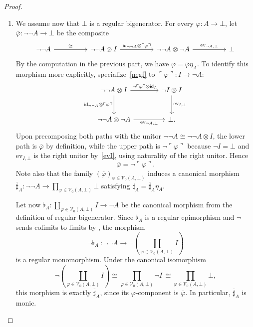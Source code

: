\documentclass[11pt,onecolumn]{article}
\newcommand{\id}{\mathsf{id}}
\newcommand{\ev}{\mathrm{ev}}
\newcommand{\cV}{\mathscr{V}}
\newcommand{\name}[1]{\ulcorner #1 \urcorner}
\theoremstyle{plain}
\theoremstyle{remark}
\theoremstyle{definition}
\begin{document}
\begin{proof}
\begin{enumerate}
		\item We assume now that $\bot$ is a regular bigenerator.
			For every $\varphi \colon A \to \bot$, let $\overline{\varphi} \colon \neg\neg A \to \bot$ be the composite
			\[
				\begin{tikzcd}[column sep=4pc]
					\neg\neg A \ar[r, "\cong"] & \neg\neg A \otimes I \ar[r, "\id_{\neg\neg A} \otimes \name{\varphi}"]
					& \neg\neg A \otimes \neg A \ar[r, "\ev_{\neg A,\bot}"] & \bot
				\end{tikzcd}
			\]
			By the computation in the previous part, we have $\varphi = \overline{\varphi}\eta_A$.
			To identify this morphism more explicitly, specialize~\eqref{negf} to
			$\name{\varphi} \colon I \to \neg A$:
			\[
				\begin{tikzcd}[column sep=large,row sep=large]
					\neg\neg A \otimes I
					\ar[r, "\neg\name{\varphi} \otimes \id_I"]
					\ar[d, "\id_{\neg\neg A} \otimes \name{\varphi}"']
					& \neg I \otimes I \ar[d, "\ev_{I,\bot}"] \\
					\neg\neg A \otimes \neg A
					\ar[r, "\ev_{\neg A,\bot}"']
					& \bot.
				\end{tikzcd}
			\]
			Upon precomposing both paths with the unitor
			$\neg\neg A \cong \neg\neg A \otimes I$, the lower path is
			$\overline{\varphi}$ by definition, while the upper path is
			$\neg\name{\varphi}$ because $\neg I = \bot$ and
			$\ev_{I,\bot}$ is the right unitor by~\eqref{evI}, using
			naturality of the right unitor.
			Hence
			\[
				\overline{\varphi} = \neg\name{\varphi}.
			\]
			Note also that the family $(\overline{\varphi})_{\varphi \in \cV_0(A,\bot)}$ induces a canonical morphism
			$\overline{\sharp}_A \colon \neg\neg A \to \prod_{\varphi \in \cV_0(A,\bot)} \bot$
			satisfying
			$\sharp_A = \overline{\sharp}_A \eta_A$.

			Let now
			$\flat_A \colon \coprod_{\varphi \in \cV_0(A,\bot)} I \to \neg A$
			be the canonical morphism from the definition of regular bigenerator.
			Since $\flat_A$ is a regular epimorphism and $\neg$ sends colimits to limits by , the morphism
			\[
				\neg \flat_A \: \colon \neg\neg A \longrightarrow \neg\!\left(\coprod_{\varphi \in \cV_0(A,\bot)} I\right)
			\]
			is a regular monomorphism.
			Under the canonical isomorphism
			\[
				\neg\!\left(\coprod_{\varphi \in \cV_0(A,\bot)} I\right) \cong \prod_{\varphi \in \cV_0(A,\bot)} \neg I \,\cong \prod_{\varphi \in \cV_0(A,\bot)} \bot,
			\]
			this morphism is exactly $\overline{\sharp}_A$, since its $\varphi$-component is $\overline{\varphi}$.
			In particular, $\overline{\sharp}_A$ is monic.


\end{enumerate}
\end{proof}
\end{document}
